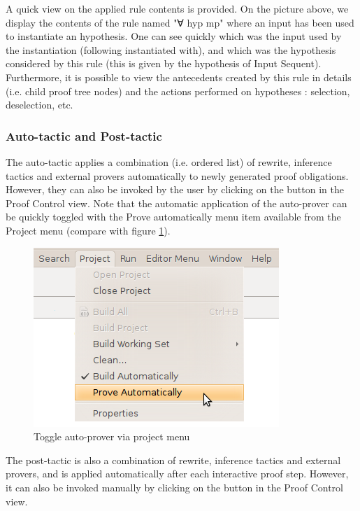 A quick view on the applied rule contents is provided. On the picture above, we display the contents of the rule named "∀ hyp mp" where an input has been used to instantiate an hypothesis. One can see quickly which was the input used by the instantiation (following instantiated with), and which was the hypothesis considered by this rule (this is given by the hypothesis of Input Sequent). Furthermore, it is possible to view the antecedents created by this rule in details (i.e. child proof tree nodes) and the actions performed on hypotheses : selection, deselection, etc. 

\subsubsection{Auto-tactic and Post-tactic}

The auto-tactic applies a combination (i.e. ordered list) of rewrite, inference tactics and external provers automatically to newly generated proof obligations. However, they can also be invoked by the user by clicking on the  button in the \textsf{Proof Control view}. Note that the automatic application of the auto-prover can be quickly toggled with the Prove automatically menu item available from the Project menu (compare with figure \ref{fig_ref_01_proving_perspective11}).

\begin{figure}[!h]
\begin{center}
	\includegraphics{img/reference/ref_01_proving_perspective11.png}
	\caption{Toggle auto-prover via project menu}
	\label{fig_ref_01_proving_perspective11}
\end{center}
\end{figure}

The post-tactic is also a combination of rewrite, inference tactics and external provers, and is applied automatically after each interactive proof step. However, it can also be invoked manually by clicking on the  button in the \textsf{Proof Control view}.

